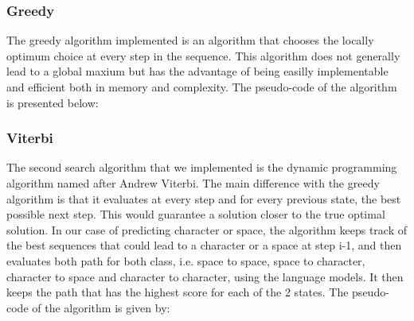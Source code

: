 \documentclass[11pt]{article}
\begin{document}
\subsubsection{Greedy}
The greedy algorithm implemented is an algorithm that chooses the locally optimum choice at every step in the sequence. This algorithm does not generally lead to a global maxium but has the advantage of being easilly implementable and efficient both in memory and complexity. The pseudo-code of the algorithm is presented below:

 \begin{algorithmic}
    \EndFor{}
    \EndProcedure{}
  \end{algorithmic}
\subsubsection{Viterbi}
The second search algorithm that we implemented is the dynamic programming algorithm named after Andrew Viterbi. The main difference with the greedy algorithm is that it evaluates at every step and for every previous state, the best possible next step. This would guarantee a solution closer to the true optimal solution. In our case of predicting character or space, the algorithm keeps track of the best sequences that could lead to a character or a space at step i-1, and then evaluates both path for both class, i.e. space to space, space to character, character to space and character to character, using the language models. It then keeps the path that has the highest score for each of the 2 states. The pseudo-code of the algorithm is given by:\\

\begin{algorithmic}
    \EndIf{}
    \EndFor{}
    \EndFor{}
    \EndFor{}
    \EndProcedure{}
  \end{algorithmic}
  
\end{document}
